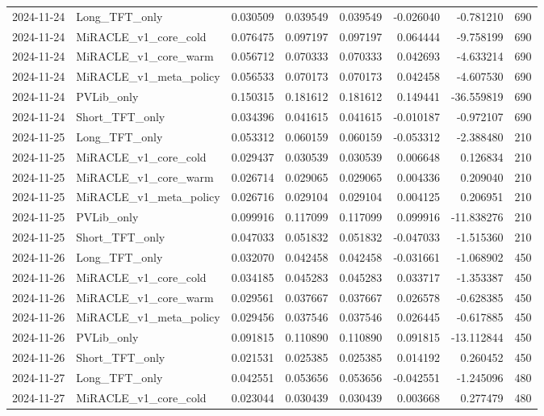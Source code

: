 \begin{tabular}{llrrrrrr}
2024-11-24 & Long_TFT_only & 0.030509 & 0.039549 & 0.039549 & -0.026040 & -0.781210 & 690 \\
2024-11-24 & MiRACLE_v1_core_cold & 0.076475 & 0.097197 & 0.097197 & 0.064444 & -9.758199 & 690 \\
2024-11-24 & MiRACLE_v1_core_warm & 0.056712 & 0.070333 & 0.070333 & 0.042693 & -4.633214 & 690 \\
2024-11-24 & MiRACLE_v1_meta_policy & 0.056533 & 0.070173 & 0.070173 & 0.042458 & -4.607530 & 690 \\
2024-11-24 & PVLib_only & 0.150315 & 0.181612 & 0.181612 & 0.149441 & -36.559819 & 690 \\
2024-11-24 & Short_TFT_only & 0.034396 & 0.041615 & 0.041615 & -0.010187 & -0.972107 & 690 \\
2024-11-25 & Long_TFT_only & 0.053312 & 0.060159 & 0.060159 & -0.053312 & -2.388480 & 210 \\
2024-11-25 & MiRACLE_v1_core_cold & 0.029437 & 0.030539 & 0.030539 & 0.006648 & 0.126834 & 210 \\
2024-11-25 & MiRACLE_v1_core_warm & 0.026714 & 0.029065 & 0.029065 & 0.004336 & 0.209040 & 210 \\
2024-11-25 & MiRACLE_v1_meta_policy & 0.026716 & 0.029104 & 0.029104 & 0.004125 & 0.206951 & 210 \\
2024-11-25 & PVLib_only & 0.099916 & 0.117099 & 0.117099 & 0.099916 & -11.838276 & 210 \\
2024-11-25 & Short_TFT_only & 0.047033 & 0.051832 & 0.051832 & -0.047033 & -1.515360 & 210 \\
2024-11-26 & Long_TFT_only & 0.032070 & 0.042458 & 0.042458 & -0.031661 & -1.068902 & 450 \\
2024-11-26 & MiRACLE_v1_core_cold & 0.034185 & 0.045283 & 0.045283 & 0.033717 & -1.353387 & 450 \\
2024-11-26 & MiRACLE_v1_core_warm & 0.029561 & 0.037667 & 0.037667 & 0.026578 & -0.628385 & 450 \\
2024-11-26 & MiRACLE_v1_meta_policy & 0.029456 & 0.037546 & 0.037546 & 0.026445 & -0.617885 & 450 \\
2024-11-26 & PVLib_only & 0.091815 & 0.110890 & 0.110890 & 0.091815 & -13.112844 & 450 \\
2024-11-26 & Short_TFT_only & 0.021531 & 0.025385 & 0.025385 & 0.014192 & 0.260452 & 450 \\
2024-11-27 & Long_TFT_only & 0.042551 & 0.053656 & 0.053656 & -0.042551 & -1.245096 & 480 \\
2024-11-27 & MiRACLE_v1_core_cold & 0.023044 & 0.030439 & 0.030439 & 0.003668 & 0.277479 & 480 \\

\end{tabular}

